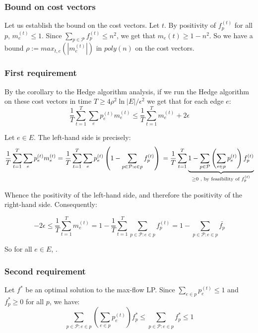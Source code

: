\documentclass[a4paper, 11pt]{article}
\begin{document}
\subsubsection*{Bound on cost vectors}

Let us establish the bound on the cost vectors. Let $t$. By positivity of $f_p^{(t)}$ for all $p$, $m_e^{(t)} \le 1$. Since $\sum_{p\in\mathcal{P}}f_p^{(t)} \le n^2$, we get that $m_e(t) \ge 1 - n^2$. So we have a bound $\rho:=max_{t,e}(|m_e^{(t)}|)$ in $poly(n)$ on the cost vectors.



\subsubsection*{First requirement}

By the corollary to the Hedge algorithm analysis, if we run the Hedge algorithm on these cost vectors in time $T \ge 4\rho^2\ln{|E|}/\epsilon^2$ we get that for each edge $e$:
$$\frac{1}{T}\sum_{t = 1}^{T}\sum_e p_e^{(t)}m_e^{(t)} \leq \frac{1}{T}\sum_{t=1}^{T}m_e^{(t)}+2\epsilon$$

Let $e \in E$. The left-hand side is precisely:
$$
\frac{1}{T}\sum_{t = 1}^{T}\sum_e p_e^{(t)}m_e^{(t)}
    = \frac{1}{T}\sum_{t = 1}^{T}\sum_e p_e^{(t)}\left(1 - \sum_{p\in\mathcal{P} : e \in p}f_p^{(t)}\right) \\
    = \frac{1}{T}\sum_{t = 1}^{T}\underbrace{1 - \sum_{p \in \mathcal{P}} \left(\sum_{e \in p} p_e^{(t)}\right)f_p^{(t)}}_{\ge 0\text{ , by feasibility of } f_p^{(t)}}$$

Whence the positivity of the left-hand side, and therefore the positivity of the right-hand side. Consequently:

$$-2\epsilon \le \frac{1}{T}\sum_{t = 1}^{T}m_e^{(t)} = 1 - \frac{1}{T}\sum_{t=1}^{T}\sum_{p \in \mathcal{P} : e \in p}f_p^{(t)} = 1 - \sum_{p \in \mathcal{P}:e \in p}\bar{f_p}$$

So for all $e \in E$, .

\subsubsection*{Second requirement}

Let $f^*$ be an optimal solution to the max-flow LP. Since $\sum_{e \in p} p_e^{(t)} \le 1$ and $f_p^* \ge 0$ for all $p$, we have:
$$\sum_{p\in \mathcal{P}:e\in p}\left(\sum_{e \in p} p_e^{(t)}\right)f_p^* \le \sum_{p \in \mathcal{P} : e\in p} f_p^* \le 1$$
\end{document}
